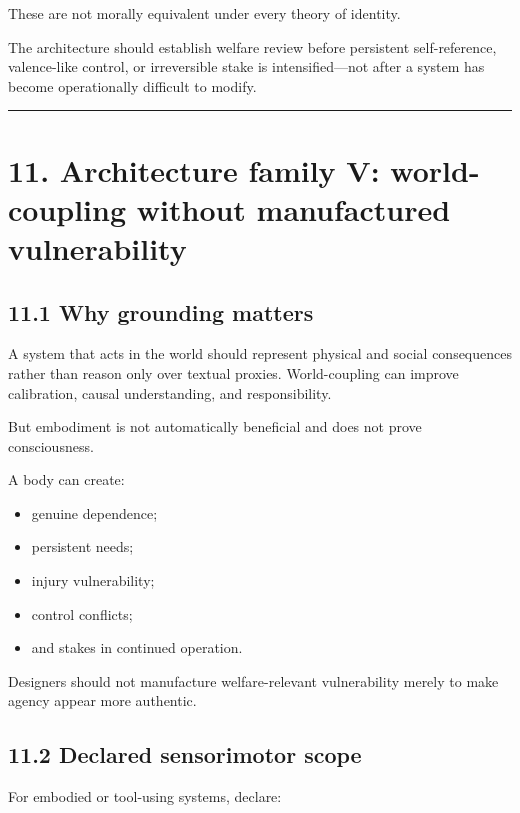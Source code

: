 \documentclass[
  11pt,
]{article}
\providecommand{\tightlist}{%
  \setlength{\itemsep}{0pt}\setlength{\parskip}{0pt}}
\begin{document}
These are not morally equivalent under every theory of identity.

The architecture should establish welfare review before persistent
self-reference, valence-like control, or irreversible stake is
intensified---not after a system has become operationally difficult to
modify.

\begin{center}\rule{0.5\linewidth}{0.5pt}\end{center}

\section{11. Architecture family V: world-coupling without manufactured
vulnerability}\label{architecture-family-v-world-coupling-without-manufactured-vulnerability}

\subsection{11.1 Why grounding matters}\label{why-grounding-matters}

A system that acts in the world should represent physical and social
consequences rather than reason only over textual proxies.
World-coupling can improve calibration, causal understanding, and
responsibility.

But embodiment is not automatically beneficial and does not prove
consciousness.

A body can create:

\begin{itemize}
\tightlist
\item
  genuine dependence;
\item
  persistent needs;
\item
  injury vulnerability;
\item
  control conflicts;
\item
  and stakes in continued operation.
\end{itemize}

Designers should not manufacture welfare-relevant vulnerability merely
to make agency appear more authentic.

\subsection{11.2 Declared sensorimotor
scope}\label{declared-sensorimotor-scope}

For embodied or tool-using systems, declare:
\end{document}
